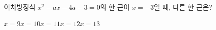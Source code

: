 이차방정식 $x^2-ax-4a-3=0$의 한 근이 $x=-3$일 때, 다른 한 근은? 
\begin{choices32}{$x=9$}{$x=10$}{$x=11$}{$x=12$}{$x=13$}\end{choices32}
